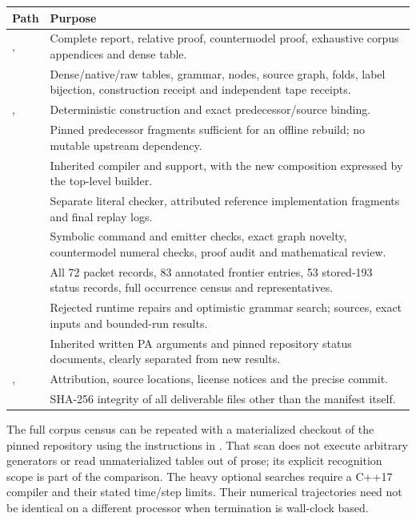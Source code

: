 \documentclass[11pt,a4paper]{article}
\begin{document}
\begin{longtable}{@{}L{.30\textwidth} L{.65\textwidth}@{}}
\toprule
Path & Purpose\\
\midrule\endhead
{},  & Complete report, relative
proof, countermodel proof, exhaustive corpus appendices and dense table.\\
 & Dense/native/raw tables, grammar, nodes, source graph,
folds, label bijection, construction receipt and independent tape receipts.\\
,  & Deterministic construction and
exact predecessor/source binding.\\
 & Pinned predecessor fragments sufficient for an offline
rebuild; no mutable upstream dependency.\\
 & Inherited compiler and support, with the new
composition expressed by the top-level builder.\\
 & Separate literal checker, attributed reference
implementation fragments and final replay logs.\\
 & Symbolic command and emitter checks, exact graph novelty,
countermodel numeral checks, proof audit and mathematical review.\\
 & All 72 packet records, 83 annotated frontier entries,
53 stored-193 status records, full occurrence census and representatives.\\
 & Rejected runtime repairs and optimistic grammar search;
sources, exact inputs and bounded-run results.\\
 & Inherited written PA arguments and pinned repository
status documents, clearly separated from new results.\\
,  & Attribution, source locations,
license notices and the precise commit.\\
 & SHA-256 integrity of all deliverable files other than
the manifest itself.\\
\bottomrule
\end{longtable}

The full corpus census can be repeated with a materialized checkout of the
pinned repository using the instructions in .
That scan does not execute arbitrary generators or read unmaterialized
tables out of prose; its explicit recognition scope is part of the
comparison. The heavy optional searches require a C++17 compiler and
their stated time/step limits. Their numerical trajectories need not be
identical on a different processor when termination is wall-clock based.
\end{document}
